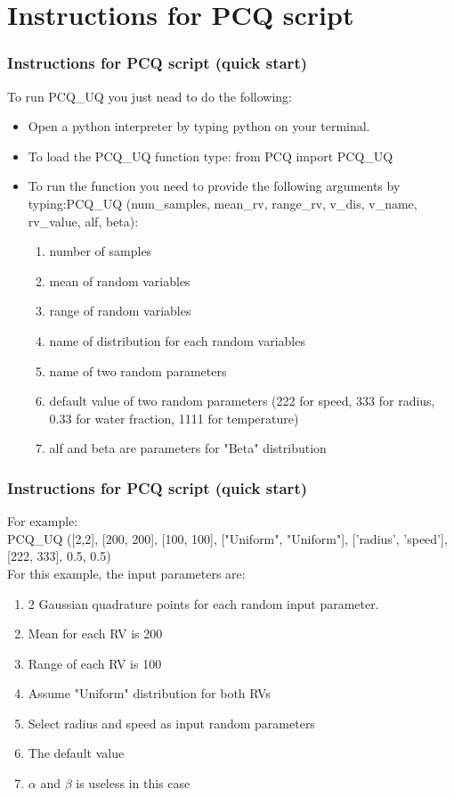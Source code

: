 \documentclass[10pt]{beamer}
\begin{document}
\section{Instructions for PCQ script}
\begin{frame}
\frametitle{Instructions for PCQ script (quick start)}
To run PCQ\_UQ you just nead to do the following:
 \begin{itemize}
 
 \item Open a python interpreter by typing python on your terminal.
 
 \item To load the PCQ\_UQ function type: from PCQ import PCQ\_UQ 
 
 \item To run the function you need to provide the following arguments by typing:\newline PCQ\_UQ (num\_samples, mean\_rv, range\_rv, v\_dis, v\_name, rv\_value, alf, beta):
  \begin{enumerate}
 \item number of samples
 \item mean of random variables
 \item range of random variables
 \item name of distribution for each random variables
 \item name of two random parameters
 \item default value of two random parameters (222 for speed, 333 for radius, 0.33 for water fraction, 1111 for temperature)
 \item alf and beta are parameters for "Beta" distribution
 \end{enumerate}

 \end{itemize}

\end{frame}
\begin{frame}
\frametitle{Instructions for PCQ script (quick start)}
For example:\\
  PCQ\_UQ ([2,2], [200, 200], [100, 100], ["Uniform", "Uniform"], ['radius', 'speed'], [222, 333], 0.5, 0.5) \\
 For this example, the input parameters are:
 \begin{enumerate}
 \item 2 Gaussian quadrature points for each random input parameter.
 \item Mean for each RV is 200
 \item Range of each RV is 100
 \item Assume "Uniform" distribution for both RVs
 \item Select radius and speed as input random parameters
 \item The default value
 \item $\alpha$ and $\beta$ is useless in this case
 \end{enumerate}

\end{frame}
\end{document}
